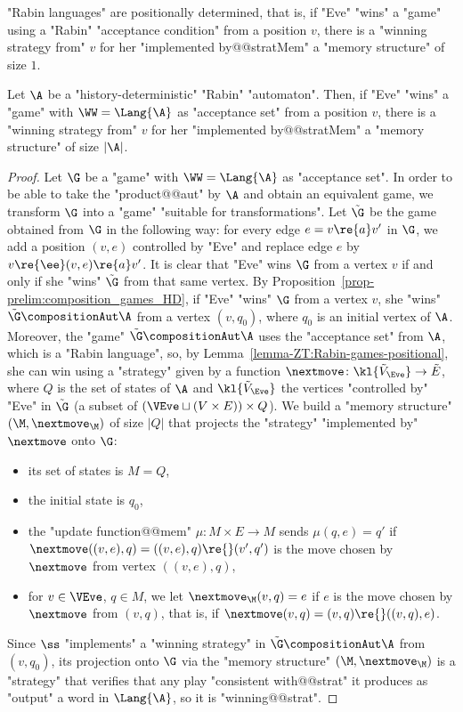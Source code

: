 \documentclass{theoretics}
\begin{document}
\begin{lemma}\label{lemma-ZT:Rabin-games-positional}
	"Rabin languages" are positionally determined, that is, if "Eve" "wins" a "game" using a "Rabin" "acceptance condition" from a position $v$, there is a "winning strategy from" $v$ for her "implemented by@@stratMem" a "memory structure" of size $1$. 
\end{lemma}

\begin{corollary}\label{cor-ZT:HD-Rabin-memory}
	Let $\A$ be a "history-deterministic" "Rabin" "automaton". Then, if "Eve" "wins" a "game" with $\WW = \Lang{\A}$ as "acceptance set" from a position $v$, there is a "winning strategy from" $v$ for her "implemented by@@stratMem" a "memory structure" of size $|\A|$.
\end{corollary}
\begin{proof}
	Let $\G$ be a "game" with $\WW = \Lang{\A}$ as "acceptance set". In order to be able to take the "product@@aut" by $\A$ and obtain an equivalent game, we transform $\G$ into a "game" "suitable for transformations". Let $\tilde{\G}$ be the game obtained from $\G$ in the following way: for every edge $e = v\re{a} v'$ in $\G$, we add a position $(v,e)$ controlled by "Eve" and replace edge $e$ by $v\re{\ee} (v,e) \re{a} v'$. It is clear that "Eve" wins $\G$ from a vertex $v$ if and only if she "wins" $\tilde{\G}$ from that same vertex.
	By Proposition~\ref{prop-prelim:composition_games_HD}, if "Eve" "wins" $\G$ from a vertex $v$, she "wins" $\tilde{\G} \compositionAut \A$ from a vertex $(v,q_0)$, where $q_0$ is an initial vertex of $\A$. Moreover, the "game" $\tilde{\G} \compositionAut \A$ uses the "acceptance set" from $\A$, which is a "Rabin language", so, by Lemma~\ref{lemma-ZT:Rabin-games-positional}, she can win using a "strategy" given by a function $\nextmove\colon \kl{\tilde{V}_\Eve}  \to \tilde{E}$, where $Q$ is the set of states of $\A$ and $\kl{\tilde{V}_\Eve}$ the vertices "controlled by" "Eve" in $\tilde{\G}$ (a subset of $(\VEve \sqcup (V\times E))\times Q$).
	We build a "memory structure" $(\M, \nextmove_\M)$  of size $|Q|$ that projects the "strategy" "implemented by" $\nextmove$ onto $\G$:	
	\begin{itemize}
		\item its set of states is $M=Q$,
		\item the initial state is $q_0$,
		\item the "update function@@mem" $\mu\colon M \times E \to M$ sends $\mu(q,e) = q'$ if $\nextmove((v,e),q) = ((v,e),q) \re{} (v',q')$ is the move chosen by $\nextmove$ from vertex $((v,e),q)$,
		\item for $v\in \VEve$, $q\in M$, we let $\nextmove_\M(v,q) = e$ if $e$ is the move chosen by $\nextmove$ from $(v,q)$, that is, if $\nextmove(v,q) = (v,q) \re{} ((v,q),e)$.
	\end{itemize}
Since $\ss$ "implements" a "winning strategy" in $\tilde{\G}\compositionAut \A$ from $(v,q_0)$, its projection onto $\G$ via the "memory structure" $(\M, \nextmove_\M)$ is a "strategy" that verifies that any play "consistent with@@strat" it produces as "output" a word in $\Lang{\A}$, so it is "winning@@strat".
\end{proof}
\end{document}
